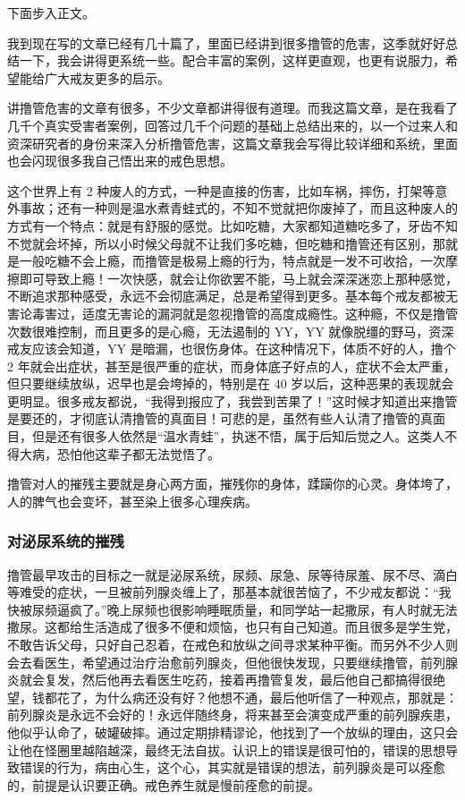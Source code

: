 \documentclass[fontset=founder]{ctexart}
\begin{document}
下面步入正文。

我到现在写的文章已经有几十篇了，里面已经讲到很多撸管的危害，这季就好好总结一下，我会讲得更系统一些。配合丰富的案例，这样更直观，也更有说服力，希望能给广大戒友更多的启示。

讲撸管危害的文章有很多，不少文章都讲得很有道理。而我这篇文章，是在我看了几千个真实受害者案例，回答过几千个问题的基础上总结出来的，以一个过来人和资深研究者的身份来深入分析撸管危害，这篇文章我会写得比较详细和系统，里面也会闪现很多我自己悟出来的戒色思想。

这个世界上有 2 种废人的方式，一种是直接的伤害，比如车祸，摔伤，打架等意外事故；还有一种则是温水煮青蛙式的，不知不觉就把你废掉了，而且这种废人的方式有一个特点：就是有舒服的感觉。比如吃糖，大家都知道糖吃多了，牙齿不知不觉就会坏掉，所以小时候父母就不让我们多吃糖，但吃糖和撸管还有区别，那就是一般吃糖不会上瘾，而撸管是极易上瘾的行为，特点就是一发不可收拾，一次摩擦即可导致上瘾！一次快感，就会让你欲罢不能，马上就会深深迷恋上那种感觉，不断追求那种感受，永远不会彻底满足，总是希望得到更多。基本每个戒友都被无害论毒害过，适度无害论的漏洞就是忽视撸管的高度成瘾性。这种瘾，不仅是撸管次数很难控制，而且更多的是心瘾，无法遏制的 YY，YY 就像脱缰的野马，资深戒友应该会知道，YY 是暗漏，也很伤身体。在这种情况下，体质不好的人，撸个 2 年就会出症状，甚至是很严重的症状，而身体底子好点的人，症状不会太严重，但只要继续放纵，迟早也是会垮掉的，特别是在 40 岁以后，这种恶果的表现就会更明显。很多戒友都说，“我得到报应了，我尝到苦果了！”这时候才知道出来撸管是要还的，才彻底认清撸管的真面目！可悲的是，虽然有些人认清了撸管的真面目，但是还有很多人依然是“温水青蛙”，执迷不悟，属于后知后觉之人。这类人不得大病，恐怕他这辈子都无法觉悟了。

撸管对人的摧残主要就是身心两方面，摧残你的身体，蹂躏你的心灵。身体垮了，人的脾气也会变坏，甚至染上很多心理疾病。

\subsubsection{对泌尿系统的摧残}

撸管最早攻击的目标之一就是泌尿系统，尿频、尿急、尿等待尿羞、尿不尽、滴白等难受的症状，一旦被前列腺炎缠上了，那基本就很苦恼了，不少戒友都说：“我快被尿频逼疯了。”晚上尿频也很影响睡眠质量，和同学站一起撒尿，有人时就无法撒尿。这都给生活造成了很多不便和烦恼，也只有自己知道。而且很多是学生党，不敢告诉父母，只好自己忍着，在戒色和放纵之间寻求某种平衡。而另外不少人则会去看医生，希望通过治疗治愈前列腺炎，但他很快发现，只要继续撸管，前列腺炎就会复发，然后他再去看医生吃药，接着再撸管复发，最后他自己都搞得很绝望，钱都花了，为什么病还没有好？他想不通，最后他听信了一种观点，那就是：前列腺炎是永远不会好的！永远伴随终身，将来甚至会演变成严重的前列腺疾患，他似乎认命了，破罐破摔。通过定期排精谬论，他找到了一个放纵的理由，这只会让他在怪圈里越陷越深，最终无法自拔。认识上的错误是很可怕的，错误的思想导致错误的行为，病由心生，这个心，其实就是错误的想法，前列腺炎是可以痊愈的，前提是认识要正确。戒色养生就是慢前痊愈的前提。
\end{document}
